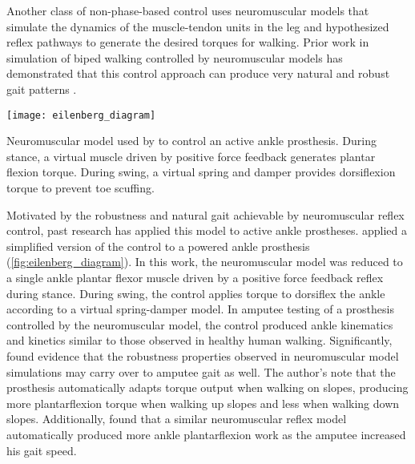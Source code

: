 Another class of non-phase-based control uses neuromuscular models that simulate
the dynamics of the muscle-tendon units in the leg and hypothesized reflex
pathways to generate the desired torques for walking. Prior work in simulation
of biped walking controlled by neuromuscular models has demonstrated that this
control approach can produce very natural and robust gait patterns
\citep{geyer2010muscle,song2013integration,song2015neural}.
\begin{marginfigure}[1in]
    \centering
    \texttt{[image: eilenberg\_diagram]} 
    \caption[Neuromuscular model used by \citet{eilenberg2010control} to control
    an active ankle prosthesis.]{Neuromuscular model used by
    \citet{eilenberg2010control} to control an active ankle prosthesis. During
    stance, a virtual muscle driven by positive force feedback generates
    plantar flexion torque. During swing, a virtual spring and damper provides
    dorsiflexion torque to prevent toe scuffing.}\label{fig:eilenberg_diagram}
\end{marginfigure}
Motivated by the robustness and natural gait achievable by neuromuscular reflex
control, past research has applied this model to active ankle prostheses.
\citet{eilenberg2010control} applied a simplified version of the control to a
powered ankle prosthesis (\cref{fig:eilenberg_diagram}). In this work, the
neuromuscular model was reduced to a single ankle plantar flexor muscle driven by
a positive force feedback reflex during stance. During swing, the control
applies torque to dorsiflex the ankle according to a virtual spring-damper
model. In amputee testing of a prosthesis controlled by the neuromuscular model,
the control produced ankle kinematics and kinetics similar to those observed in
healthy human walking. Significantly, \citeauthor{eilenberg2010control} found
evidence that the robustness properties observed in neuromuscular model
simulations may carry over to amputee gait as well. The author's note that the
prosthesis automatically adapts torque output when walking on slopes, producing
more plantarflexion torque when walking up slopes and less when walking down
slopes. Additionally, \citet{markowitz2011speed} found that a similar
neuromuscular reflex model automatically produced more ankle plantarflexion work
as the amputee increased his gait speed.

